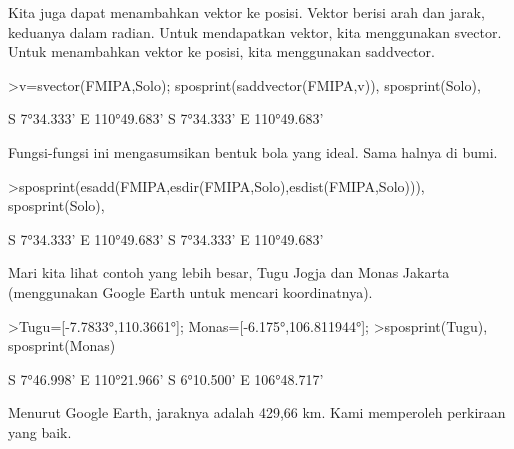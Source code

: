 \documentclass[a4paper,10pt]{article}
\begin{document}
\begin{eulernotebook}
\begin{eulercomment}
\begin{eulercomment}
\begin{eulercomment}
\begin{eulercomment}
\begin{eulercomment}
\begin{eulercomment}
\begin{eulercomment}
\begin{eulercomment}
\begin{eulercomment}
\begin{eulercomment}
\begin{eulercomment}
\begin{eulercomment}
\begin{eulercomment}
\begin{eulercomment}
\begin{eulercomment}
\begin{eulercomment}
\begin{eulercomment}
\begin{eulercomment}
\begin{eulercomment}
\begin{eulercomment}
\begin{eulercomment}
\begin{eulercomment}
\begin{eulercomment}
\begin{eulercomment}
\begin{eulercomment}
\begin{eulercomment}
\begin{eulercomment}
\begin{eulercomment}
\begin{eulercomment}
\begin{eulercomment}
\begin{eulercomment}
Kita juga dapat menambahkan vektor ke posisi. Vektor berisi arah dan
jarak, keduanya dalam radian. Untuk mendapatkan vektor, kita
menggunakan svector. Untuk menambahkan vektor ke posisi, kita
menggunakan saddvector.
\end{eulercomment}
\begin{eulerprompt}
>v=svector(FMIPA,Solo); sposprint(saddvector(FMIPA,v)), sposprint(Solo),
\end{eulerprompt}
\begin{euleroutput}
  S 7°34.333' E 110°49.683'
  S 7°34.333' E 110°49.683'
\end{euleroutput}
\begin{eulercomment}
Fungsi-fungsi ini mengasumsikan bentuk bola yang ideal. Sama halnya di
bumi.
\end{eulercomment}
\begin{eulerprompt}
>sposprint(esadd(FMIPA,esdir(FMIPA,Solo),esdist(FMIPA,Solo))), sposprint(Solo),
\end{eulerprompt}
\begin{euleroutput}
  S 7°34.333' E 110°49.683'
  S 7°34.333' E 110°49.683'
\end{euleroutput}
\begin{eulercomment}
Mari kita lihat contoh yang lebih besar, Tugu Jogja dan Monas Jakarta
(menggunakan Google Earth untuk mencari koordinatnya).
\end{eulercomment}
\begin{eulerprompt}
>Tugu=[-7.7833°,110.3661°]; Monas=[-6.175°,106.811944°];
>sposprint(Tugu), sposprint(Monas)
\end{eulerprompt}
\begin{euleroutput}
  S 7°46.998' E 110°21.966'
  S 6°10.500' E 106°48.717'
\end{euleroutput}
\begin{eulercomment}
Menurut Google Earth, jaraknya adalah 429,66 km. Kami memperoleh
perkiraan yang baik.
\end{eulercomment}

\end{eulercomment}
\end{eulercomment}
\end{eulercomment}
\end{eulercomment}
\end{eulercomment}
\end{eulercomment}
\end{eulercomment}
\end{eulercomment}
\end{eulercomment}
\end{eulercomment}
\end{eulercomment}
\end{eulercomment}
\end{eulercomment}
\end{eulercomment}
\end{eulercomment}
\end{eulercomment}
\end{eulercomment}
\end{eulercomment}
\end{eulercomment}
\end{eulercomment}
\end{eulercomment}
\end{eulercomment}
\end{eulercomment}
\end{eulercomment}
\end{eulercomment}
\end{eulercomment}
\end{eulercomment}
\end{eulercomment}
\end{eulercomment}
\end{eulercomment}
\end{eulernotebook}
\end{document}
